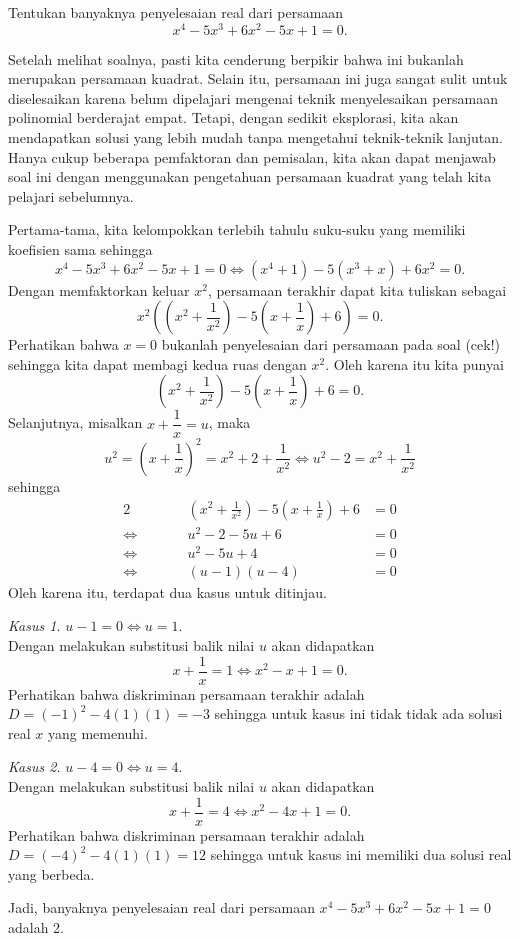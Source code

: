 	\begin{contoh}
		Tentukan banyaknya penyelesaian real dari persamaan
		\[ x^{4} - 5x^{3} + 6x^{2} - 5x + 1 = 0. \]
	\end{contoh}
	\begin{jawab}
		Setelah melihat soalnya, pasti kita cenderung berpikir bahwa ini bukanlah merupakan persamaan kuadrat. Selain itu, persamaan ini juga sangat sulit untuk diselesaikan karena belum dipelajari mengenai teknik menyelesaikan persamaan polinomial berderajat empat. Tetapi, dengan sedikit eksplorasi, kita akan mendapatkan solusi yang lebih mudah tanpa mengetahui teknik-teknik lanjutan. Hanya cukup beberapa pemfaktoran dan pemisalan, kita akan dapat menjawab soal ini dengan menggunakan pengetahuan persamaan kuadrat yang telah kita pelajari sebelumnya.
		\par \noindent Pertama-tama, kita kelompokkan terlebih tahulu suku-suku yang memiliki koefisien sama sehingga
		\[ x^{4} - 5x^{3} + 6x^{2} - 5x + 1 = 0 \iff \left(x^{4} + 1\right) - 5\left(x^{3} + x\right) + 6x^{2} = 0. \]
		Dengan memfaktorkan keluar $ x^{2} $, persamaan terakhir dapat kita tuliskan sebagai
		\[ x^{2}\left(\left(x^{2} + \frac{1}{x^{2}}\right) - 5\left(x + \frac{1}{x}\right) + 6\right) = 0. \]
		Perhatikan bahwa $ x = 0 $ bukanlah penyelesaian dari persamaan pada soal (cek!) sehingga kita dapat membagi kedua ruas dengan $ x^{2} $. Oleh karena itu kita punyai
		\[ \left(x^{2} + \frac{1}{x^{2}}\right) - 5\left(x + \frac{1}{x}\right) + 6 = 0. \]
		Selanjutnya, misalkan $ x + \dfrac{1}{x} = u $, maka
		\[ u^{2} = \left(x + \frac{1}{x}\right)^{2} = x^{2} + 2 + \frac{1}{x^{2}} \iff u^{2} - 2 = x^{2} + \frac{1}{x^{2}} \]
		sehingga
		\begin{alignat*}{2}
			&\qquad& \left(x^{2} + \frac{1}{x^{2}}\right) - 5\left(x + \frac{1}{x}\right) + 6 &= 0 \\
			\iff&& u^{2} - 2 - 5u + 6 &= 0 \\
			\iff&& u^{2} - 5u + 4 &= 0 \\
			\iff&& \left(u - 1\right)\left(u - 4\right) &= 0
		\end{alignat*}
		Oleh karena itu, terdapat dua kasus untuk ditinjau.
		\par \noindent \textit{Kasus 1.} $ u - 1 = 0 \iff u = 1 $. \\
		Dengan melakukan substitusi balik nilai $ u $ akan didapatkan
		\[ x + \frac{1}{x} = 1 \iff x^{2} - x + 1 = 0. \]
		Perhatikan bahwa diskriminan persamaan terakhir adalah $ D = \left(-1\right)^{2} - 4\left(1\right)\left(1\right) = -3 $ sehingga untuk kasus ini tidak tidak ada solusi real $ x $ yang memenuhi.
		\par \noindent \textit{Kasus 2.} $ u - 4 = 0 \iff u = 4 $. \\
		Dengan melakukan substitusi balik nilai $ u $ akan didapatkan
		\[ x + \frac{1}{x} = 4 \iff x^{2} - 4x + 1 = 0. \]
		Perhatikan bahwa diskriminan persamaan terakhir adalah $ D = \left(-4\right)^{2} - 4\left(1\right)\left(1\right) = 12 $ sehingga untuk kasus ini memiliki dua solusi real yang berbeda.
		\par \noindent Jadi, banyaknya penyelesaian real dari persamaan $ x^{4} - 5x^{3} + 6x^{2} - 5x + 1 = 0 $ adalah 2.
	\end{jawab}
	
